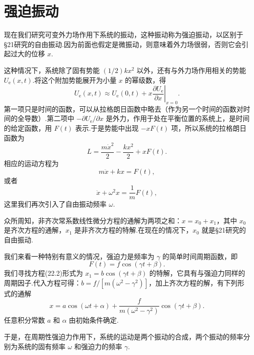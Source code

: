 \section{强迫振动}

现在我们研究可变外力场作用下系统的振动，这种振动称为强迫振动，以区别于§21研究的自由振动.因为前面也假定是微振动，则意味着外力场很弱，否则它会引起过大的位移 $x$.

这种情况下，系统除了固有势能 $(1/2)kx^2$ 以外，还有与外力场作用相关的势能 $U_{\mathrm{e}}(x,t)$.将这个附加势能展开为小量 $x$ 的幂级数，得
\begin{equation*}
  U_{\mathrm{e}}(x,t)\approx U_{\mathrm{e}}(0,t)
  +\left.x\frac{\partial U_{\mathrm{e}}}{\partial x}\right|_{x=0}.
\end{equation*}
第一项只是时间的函数，可以从拉格朗日函数中略去（作为另一个时间的函数对时间的全导数）.第二项中 $-\partial U_{\mathrm{e}}/\partial x$ 是外力，作用于处在平衡位置的系统上，是时间的给定函数，用 $F(t)$ 表示.于是势能中出现 $-xF(t)$ 项，所以系统的拉格朗日函数为
\begin{equation}
  L=\frac{m\dot{x}^2}{2}-\frac{kx^2}{2}+xF(t).
\end{equation}
相应的运动方程为
\begin{equation*}
  m\ddot{x}+kx=F(t),
\end{equation*}
或者
\begin{equation}
  \ddot{x}+\omega^2x=\frac{1}{m}F(t),
\end{equation}
这里我们再次引入了自由振动频率 $\omega$.

众所周知，非齐次常系数线性微分方程的通解为两项之和：$x=x_0+x_1$，其中 $x_0$ 是齐次方程的通解，$x_1$ 是非齐次方程的特解.在现在的情况下，$x_0$ 就是§21研究的自由振动.

我们来看一种特别有意义的情况，强迫力是频率为 $\gamma$ 的简单时间周期函数，即
\begin{equation}
  F(t)=f\cos(\gamma t+\beta).
\end{equation}
我们寻找方程(22.2)形式为 $x_1=b\cos(\gamma t+\beta)$ 的特解，它具有与强迫力同样的周期因子.代入方程可得：$b=f/[m(\omega^2-\gamma^2)]$，加上齐次方程的解，有下列形式的通解
\begin{equation}
  x=a\cos(\omega t+\alpha)+\frac{f}{m\left(\omega^2-\gamma^2\right)}\cos(\gamma t+\beta).
\end{equation}
任意积分常数 $a$ 和 $\alpha$ 由初始条件确定.

于是，在周期性强迫力作用下，系统的运动是两个振动的合成，两个振动的频率分别为系统的固有频率 $\omega$ 和强迫力的频率 $\gamma$.

